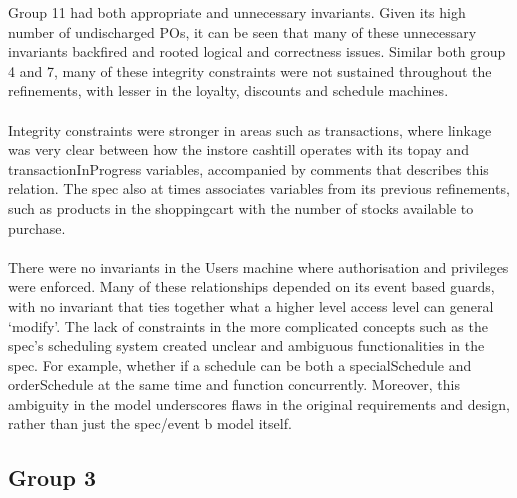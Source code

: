 Group 11 had both appropriate and unnecessary invariants. Given its high number of undischarged POs, it can be seen that many of these unnecessary invariants backfired and rooted logical and correctness issues. Similar both group 4 and 7, many of these integrity constraints were not sustained throughout the refinements, with lesser in the loyalty, discounts and schedule machines.
 \\ \\ Integrity constraints were stronger in areas such as transactions, where linkage was very clear between how the instore cashtill operates with its topay and transactionInProgress variables, accompanied by comments that describes this relation. The spec also at times associates variables from its previous refinements, such as products in the shoppingcart with the number of stocks available to purchase.
 \\ \\ There were no invariants in the Users machine where authorisation and privileges were enforced. Many of these relationships depended on its event based guards, with no invariant that ties together what a higher level access level can general ‘modify’. The lack of constraints in the more complicated concepts such as the spec’s scheduling system created unclear and ambiguous functionalities in the spec. For example, whether if a schedule can be both a specialSchedule and orderSchedule at the same time and function concurrently. Moreover, this ambiguity in the model underscores flaws in the original requirements and design, rather than just the spec\slash event b model itself.

\subsection{Group 3}
\label{group3}

